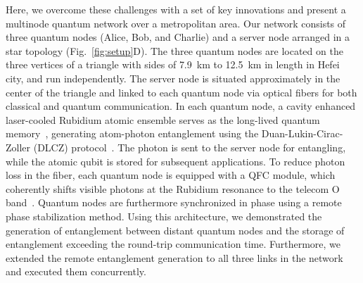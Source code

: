 \documentclass[aps,reprint,showpacs,superscriptaddress]{revtex4-2}
\begin{document}
Here, we overcome these challenges with a set of key innovations and present a multinode quantum network over a metropolitan area. Our network consists of three quantum nodes (Alice, Bob, and Charlie) and a server node arranged in a star topology (Fig.~\ref{fig:setup}D). The three quantum nodes are located on the three vertices of a triangle with sides of 7.9~km to 12.5~km in length in Hefei city, and run independently. The server node is situated approximately in the center of the triangle and linked to each quantum node via optical fibers for both classical and quantum communication. In each quantum node, a cavity enhanced laser-cooled Rubidium atomic ensemble serves as the long-lived quantum memory~\cite{bao2012}, generating atom-photon entanglement using the Duan-Lukin-Cirac-Zoller (DLCZ) protocol~\cite{duan2001}. The photon is sent to the server node for entangling, while the atomic qubit is stored for subsequent applications. To reduce photon loss in the fiber, each quantum node is equipped with a QFC module, which coherently shifts visible photons at the Rubidium resonance to the telecom O band~\cite{yu2020}. Quantum nodes are furthermore synchronized in phase using a remote phase stabilization method. Using this architecture, we demonstrated the generation of entanglement between distant quantum nodes and the storage of entanglement exceeding the round-trip communication time. Furthermore, we extended the remote entanglement generation to all three links in the network and executed them concurrently.
\end{document}
